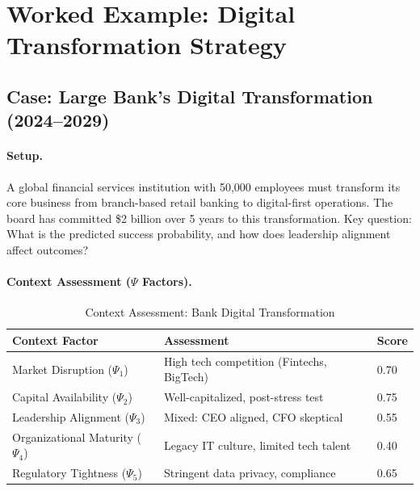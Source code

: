 
\section{Worked Example: Digital Transformation Strategy}
\label{sec:sdm-example}

\subsection{Case: Large Bank's Digital Transformation (2024--2029)}

\paragraph{Setup.}

A global financial services institution with 50,000 employees must transform its core business from branch-based retail banking to digital-first operations. The board has committed \$2 billion over 5 years to this transformation. Key question: What is the predicted success probability, and how does leadership alignment affect outcomes?

\paragraph{Context Assessment ($\Psi$ Factors).}

\begin{table}[htbp]
\centering
\caption{Context Assessment: Bank Digital Transformation}
\label{tab:sdm-case-context}
\renewcommand{\arraystretch}{1.3}
\begin{tabular}{@{}lll@{}}
\toprule
\textbf{Context Factor} & \textbf{Assessment} & \textbf{Score} \\
\midrule
Market Disruption ($\Psi_1$) & High tech competition (Fintechs, BigTech) & 0.70 \\
Capital Availability ($\Psi_2$) & Well-capitalized, post-stress test & 0.75 \\
Leadership Alignment ($\Psi_3$) & Mixed: CEO aligned, CFO skeptical & 0.55 \\
Organizational Maturity ($\Psi_4$) & Legacy IT culture, limited tech talent & 0.40 \\
Regulatory Tightness ($\Psi_5$) & Stringent data privacy, compliance & 0.65 \\
\bottomrule
\end{tabular}
\end{table}

